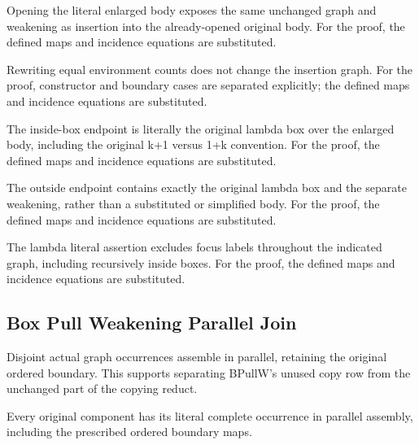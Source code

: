 Opening the literal enlarged body exposes the same unchanged graph and weakening as insertion into the already-opened original body.
For the proof, the defined maps and incidence equations are substituted.
\par{}

Rewriting equal environment counts does not change the insertion graph.
For the proof, constructor and boundary cases are separated explicitly; the defined maps and incidence equations are substituted.
\par{}

The inside-box endpoint is literally the original lambda box over the enlarged body, including the original k+1 versus 1+k convention.
For the proof, the defined maps and incidence equations are substituted.
\par{}

The outside endpoint contains exactly the original lambda box and the separate weakening, rather than a substituted or simplified body.
For the proof, the defined maps and incidence equations are substituted.
\par{}

The lambda literal assertion excludes focus labels throughout the indicated graph, including recursively inside boxes.
For the proof, the defined maps and incidence equations are substituted.
\par{}

\subsection{Box Pull Weakening Parallel Join}
Disjoint actual graph occurrences assemble in parallel, retaining the original ordered boundary. This supports separating BPullW's unused copy row from the unchanged part of the copying reduct.

Every original component has its literal complete occurrence in parallel assembly, including the prescribed ordered boundary maps.
\par{}

